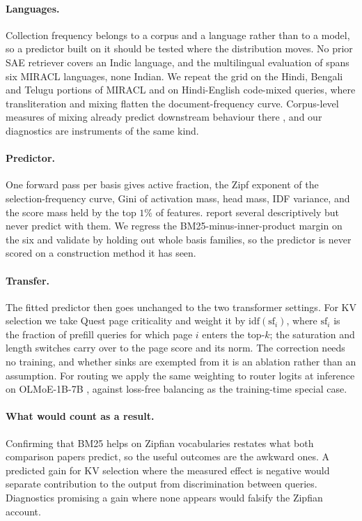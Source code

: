 \documentclass[11pt]{article}
\newcommand{\idf}{\mathrm{idf}}
\newcommand{\sfreq}{\mathrm{sf}}
\begin{document}
\paragraph{Languages.} Collection frequency belongs to a corpus and a language
rather than to a model, so a predictor built on it should be tested where the
distribution moves. No prior SAE retriever covers an Indic language, and the
multilingual evaluation of \citet{zong2026tokens} spans six MIRACL languages,
none Indian. We repeat the grid on the Hindi, Bengali and Telugu
portions of MIRACL \citep{zhang2023miracl} and on Hindi-English code-mixed
queries, where transliteration and mixing flatten the document-frequency curve.
Corpus-level measures of mixing already predict downstream behaviour there
\citep{kodali2022symcom}, and our diagnostics are instruments of the same kind.

\paragraph{Predictor.} One forward pass per basis gives active fraction, the
Zipf exponent of the selection-frequency curve, Gini of activation mass, head
mass, IDF variance, and the score mass held by the top $1\%$ of features.
\citet{han2026bm25v} report several descriptively but never predict with them. We
regress the BM25-minus-inner-product margin on the six and validate by holding
out whole basis families, so the predictor is never scored on a construction
method it has seen.

\paragraph{Transfer.} The fitted predictor then goes unchanged to the two
transformer settings. For KV selection we take Quest page criticality
\citep{tang2024quest} and weight it by $\idf(\sfreq_i)$, where $\sfreq_i$ is the
fraction of prefill queries for which page $i$ enters the top-$k$; the saturation
and length switches carry over to the page score and its norm. The correction
needs no training, and whether sinks are exempted from it is an ablation rather
than an assumption. For routing we apply the same weighting to router logits at
inference on OLMoE-1B-7B \citep{muennighoff2025olmoe}, against loss-free
balancing as the training-time special case.

\paragraph{What would count as a result.} Confirming that BM25 helps on Zipfian
vocabularies restates what both comparison papers predict, so the useful outcomes
are the awkward ones. A predicted gain for KV selection where the measured effect
is negative would separate contribution to the output from discrimination between
queries. Diagnostics promising a gain where none appears would falsify the
Zipfian account.


\end{document}
